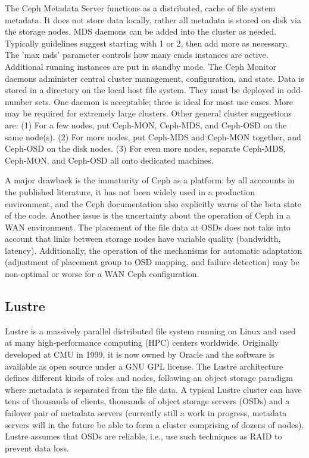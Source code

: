 \documentclass[11pt]{article}
\begin{document}
The Ceph Metadata Server functions as a distributed, cache of file system 
metadata. It does not store data locally, rather all metadata is stored on 
disk via the storage nodes. MDS daemons can be added into the cluster as 
needed. Typically guidelines suggest starting with 1 or 2, then add more 
as necessary. The 'max mds' parameter controls how many cmds instances 
are active. Additional running instances are put in standby mode. The 
Ceph Monitor daemons administer central cluster management, configuration, 
and state. Data is stored in a directory on the local host file system. 
They must be deployed in odd-number sets. One daemon is acceptable; three 
is ideal for most use cases. More may be required for extremely large 
clusters. Other general cluster suggestions are: (1) For a few nodes,  
put Ceph-MON, Ceph-MDS, and Ceph-OSD on the same node(s). (2) For more 
nodes,  put Ceph-MDS and Ceph-MON together, and Ceph-OSD on the disk nodes. 
(3) For even more nodes, separate Ceph-MDS, Ceph-MON, and Ceph-OSD all 
onto dedicated machines.

A major drawback is the immaturity of Ceph as a platform: by all acccounts 
in the published literature, it has not been widely used in a production 
environment, and the Ceph documentation also explicitly warns of the beta 
state of the code. Another issue is the uncertainty about the operation 
of Ceph in a WAN environment. The placement of the file data at OSDs does 
not take into account that links between storage nodes have variable 
quality (bandwidth, latency). Additionally, the operation of the mechanisms 
for automatic adaptation (adjustment of placement group to OSD mapping, 
and failure detection) may be non-optimal or worse for a WAN Ceph 
configuration.

\subsection{Lustre}
Lustre is a massively parallel distributed file system running on Linux 
and used at many high-performance computing (HPC) centers worldwide. 
Originally developed at CMU in 1999, it is now owned by Oracle and the 
software is available as open source under a GNU GPL license. The Lustre 
architecture defines different kinds of roles and nodes, following an object 
storage paradigm where metadata is separated from the file data. A typical 
Lustre cluster can have tens of thousands of clients, thousands of object 
storage servers (OSDs) and a failover pair of metadata servers (currently 
still a work in progress, metadata servers will in the future be able to 
form a cluster comprising of dozens of nodes). Lustre assumes that OSDs 
are reliable, i.e., use such techniques as RAID to prevent data loss.
\end{document}
